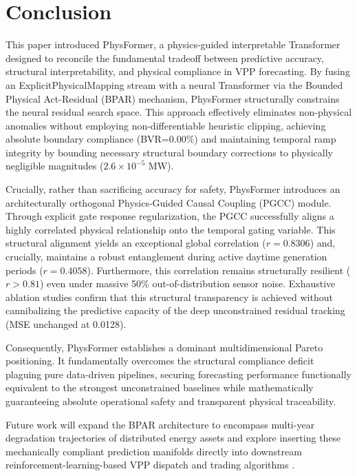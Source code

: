 \section{Conclusion}
\label{sec:conclusion}

This paper introduced PhysFormer, a physics-guided interpretable Transformer designed to reconcile the fundamental tradeoff between predictive accuracy, structural interpretability, and physical compliance in VPP forecasting. By fusing an ExplicitPhysicalMapping stream with a neural Transformer via the Bounded Physical Act-Residual (BPAR) mechanism, PhysFormer structurally constrains the neural residual search space. This approach effectively eliminates non-physical anomalies without employing non-differentiable heuristic clipping, achieving absolute boundary compliance (BVR=0.00\%) and maintaining temporal ramp integrity by bounding necessary structural boundary corrections to physically negligible magnitudes ($2.6 \times 10^{-5}$ MW).

Crucially, rather than sacrificing accuracy for safety, PhysFormer introduces an architecturally orthogonal Physics-Guided Causal Coupling (PGCC) module. Through explicit gate response regularization, the PGCC successfully aligns a highly correlated physical relationship onto the temporal gating variable. This structural alignment yields an exceptional global correlation ($r=0.8306$) and, crucially, maintains a robust entanglement during active daytime generation periods ($r=0.4058$). Furthermore, this correlation remains structurally resilient ($r > 0.81$) even under massive 50\% out-of-distribution sensor noise. Exhaustive ablation studies confirm that this structural transparency is achieved without cannibalizing the predictive capacity of the deep unconstrained residual tracking (MSE unchanged at 0.0128).

Consequently, PhysFormer establishes a dominant multidimensional Pareto positioning. It fundamentally overcomes the structural compliance deficit plaguing pure data-driven pipelines, securing forecasting performance functionally equivalent to the strongest unconstrained baselines while mathematically guaranteeing absolute operational safety and transparent physical traceability.

Future work will expand the BPAR architecture to encompass multi-year degradation trajectories of distributed energy assets and explore inserting these mechanically compliant prediction manifolds directly into downstream reinforcement-learning-based VPP dispatch and trading algorithms \cite{Ma2025, Arabzadeh2025}.
